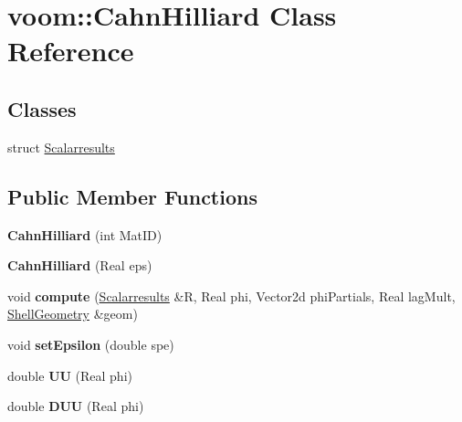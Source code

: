 \hypertarget{classvoom_1_1_cahn_hilliard}{
\section{voom::CahnHilliard Class Reference}
\label{classvoom_1_1_cahn_hilliard}
}
\subsection*{Classes}
\begin{DoxyCompactItemize}
\item 
struct \hyperlink{structvoom_1_1_cahn_hilliard_1_1_scalarresults}{Scalarresults}
\end{DoxyCompactItemize}
\subsection*{Public Member Functions}
\begin{DoxyCompactItemize}
\item 
\hypertarget{classvoom_1_1_cahn_hilliard_a026df99411e78ce1da421fe79958c167}{
{\bfseries CahnHilliard} (int MatID)}
\label{classvoom_1_1_cahn_hilliard_a026df99411e78ce1da421fe79958c167}

\item 
\hypertarget{classvoom_1_1_cahn_hilliard_aec847fb8560c3b17e1b5850eb1217c78}{
{\bfseries CahnHilliard} (Real eps)}
\label{classvoom_1_1_cahn_hilliard_aec847fb8560c3b17e1b5850eb1217c78}

\item 
\hypertarget{classvoom_1_1_cahn_hilliard_a88262458f440dac624559911ae1b9663}{
void {\bfseries compute} (\hyperlink{structvoom_1_1_cahn_hilliard_1_1_scalarresults}{Scalarresults} \&R, Real phi, Vector2d phiPartials, Real lagMult, \hyperlink{classvoom_1_1_shell_geometry}{ShellGeometry} \&geom)}
\label{classvoom_1_1_cahn_hilliard_a88262458f440dac624559911ae1b9663}

\item 
\hypertarget{classvoom_1_1_cahn_hilliard_a729ef0fac42a47f5db46961c9e9434e8}{
void {\bfseries setEpsilon} (double spe)}
\label{classvoom_1_1_cahn_hilliard_a729ef0fac42a47f5db46961c9e9434e8}

\item 
\hypertarget{classvoom_1_1_cahn_hilliard_ab717945a9b0f6d68a1d802f2a1d8e35b}{
double {\bfseries UU} (Real phi)}
\label{classvoom_1_1_cahn_hilliard_ab717945a9b0f6d68a1d802f2a1d8e35b}

\item 
\hypertarget{classvoom_1_1_cahn_hilliard_ad3aee855111decbfbaf1735cd8db6b8e}{
double {\bfseries DUU} (Real phi)}
\label{classvoom_1_1_cahn_hilliard_ad3aee855111decbfbaf1735cd8db6b8e}

\end{DoxyCompactItemize}
